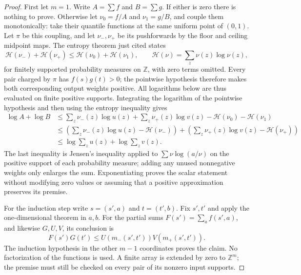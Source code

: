 \documentclass[11pt]{article}
\newcommand{\Z}{\mathbb Z}
\theoremstyle{definition}
\theoremstyle{remark}
\numberwithin{equation}{section}
\begin{document}
\begin{proof}
First let $m=1$.  Write $A=\sum f$ and $B=\sum g$.
If either is zero there is nothing to prove.  Otherwise let
$\nu_0=f/A$ and $\nu_1=g/B$, and couple them monotonically: take
their quantile functions at the same uniform point of $(0,1)$.
Let $\pi$ be this coupling, and let $\nu_-,\nu_+$ be its pushforwards
by the floor and ceiling midpoint maps.  The entropy theorem just
cited states
\[
 \mathcal H(\nu_-)+\mathcal H(\nu_+)
 \le\mathcal H(\nu_0)+\mathcal H(\nu_1),
 \qquad \mathcal H(\nu)=\sum_z\nu(z)\log\nu(z),
\]
for finitely supported probability measures on $\Z$, with zero terms
omitted.  Every pair charged by $\pi$ has $f(s)g(t)>0$; the
pointwise hypothesis therefore makes both corresponding output weights
positive.  All logarithms below are thus evaluated on finite positive
supports.  Integrating the logarithm of the pointwise hypothesis and
then using the entropy inequality gives
\begin{align*}
 \log A+\log B
 &\le\sum_z\nu_-(z)\log u(z)+\sum_z\nu_+(z)\log v(z)
            -\mathcal H(\nu_0)-\mathcal H(\nu_1)\\
 &\le\left(\sum_z\nu_-(z)\log u(z)-\mathcal H(\nu_-)\right)
     +\left(\sum_z\nu_+(z)\log v(z)-\mathcal H(\nu_+)\right)\\
 &\le\log\sum_z u(z)+\log\sum_z v(z).
\end{align*}
The last inequality is Jensen's inequality applied to
$\sum\nu\log(a/\nu)$ on the positive support of each probability
measure; adding any unused nonnegative weights only enlarges the sum.
Exponentiating proves the scalar statement without modifying zero
values or assuming that a positive approximation preserves its premise.

For the induction step write $s=(s',a)$ and $t=(t',b)$.  Fix $s',t'$
and apply the one-dimensional theorem in $a,b$.  For the partial sums
$F(s')=\sum_a f(s',a)$, and likewise $G,U,V$, its conclusion is
\[
 F(s')G(t')\leq
 U(m_-(s',t'))V(m_+(s',t')).
\]
The induction hypothesis in the other $m-1$ coordinates proves the
claim.  No factorization of the functions is used.  A finite array is
extended by zero to $\Z^m$; the premise must still be checked on every
pair of its nonzero input supports.
\end{proof}
\end{document}
